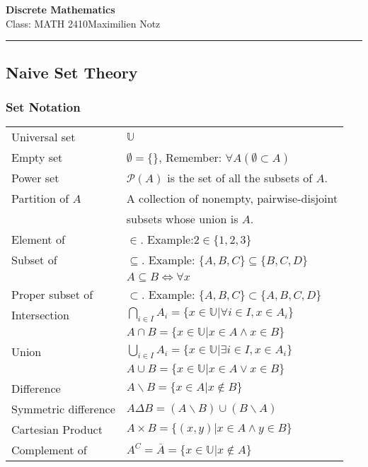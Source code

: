 \documentclass[5pt]{article}
\newcommand{\universalSet}{\mathbb{U}}
\begin{document}
\newtheorem{theorem}{Theorem}
\newtheorem{properties}{Properties}
\newtheorem{axiom}{Axiom}


\begin{center}
     \Large{\textbf{Discrete Mathematics}}\\
     \small{Class: MATH 2410}\hfill\small{\textcopyright Maximilien Notz \the\year{}}
     \noindent\rule{20.2cm}{0.4pt}
\end{center}


\begin{multicols}{2}
\setcounter{secnumdepth}{0}


\subsection{Naive Set Theory}
\subsubsection{Set Notation}
\begin{tabular}{ll}
    Universal set           & $\universalSet$\\
    Empty set               & $\emptyset=\{\}$, Remember: $\forall A (\emptyset\subset A)$\\
    Power set               & $\mathcal{P}(A)$ is the set of all the subsets of $A$.\\
    Partition of $A$        & A collection of nonempty, \small{pairwise-disjoint}\\
                            & subsets whose union is $A$.\\
    Element of              & $\in$. Example:$2\in\{1,2,3\}$\\
    Subset of               & $\subseteq$. Example: $\{A, B,C\}\subseteq\{B,C,D\}$\\
                            & $A\subseteq B \Leftrightarrow\forall x$\\
    Proper subset of        & $\subset$. Example: $\{A, B,C\}\subset\{A, B,C,D\}$\\
    Intersection            & $\bigcap_{i\in I}A_i=\{x\in\universalSet|\forall i\in I, x\in A_i\}$\\
                            & $A\cap B=\{x\in\universalSet|x\in A\land x\in B\}$\\
    Union                   & $\bigcup_{i\in I}A_i=\{x\in\universalSet|\exists i\in I, x\in A_i\}$\\
                            & $A\cup B=\{x\in\universalSet|x\in A\lor x\in B\}$\\
    Difference              & $A\backslash B=\{x\in A|x\notin B\}$\\
    Symmetric difference    & $A\Delta B=(A\backslash B)\cup(B\backslash A)$\\
    Cartesian Product       & $A\times B=\{(x,y)|x\in A\land y \in B\}$\\
    Complement of           & $A^C=\bar{A}=\{x\in\universalSet|x\notin A\}$\\
\end{tabular}


\end{multicols}
\end{document}
